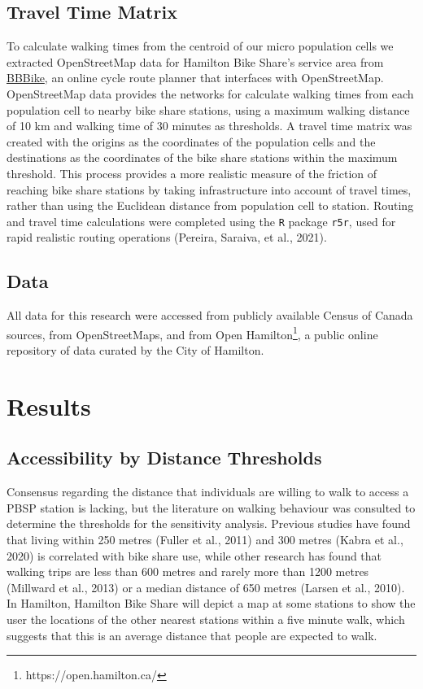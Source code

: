 \documentclass[]{elsarticle} %
\begin{document}
\hypertarget{travel-time-matrix}{%
\subsection{Travel Time Matrix}\label{travel-time-matrix}}

To calculate walking times from the centroid of our micro population
cells we extracted OpenStreetMap data for Hamilton Bike Share's service
area from \href{https://download.bbbike.org/osm/bbbike/}{BBBike}, an
online cycle route planner that interfaces with OpenStreetMap.
OpenStreetMap data provides the networks for calculate walking times
from each population cell to nearby bike share stations, using a maximum
walking distance of 10 km and walking time of 30 minutes as thresholds.
A travel time matrix was created with the origins as the coordinates of
the population cells and the destinations as the coordinates of the bike
share stations within the maximum threshold. This process provides a
more realistic measure of the friction of reaching bike share stations
by taking infrastructure into account of travel times, rather than using
the Euclidean distance from population cell to station. Routing and
travel time calculations were completed using the \texttt{R} package
\texttt{r5r}, used for rapid realistic routing operations (Pereira,
Saraiva, et al., 2021).

\hypertarget{data}{%
\subsection{Data}\label{data}}

All data for this research were accessed from publicly available Census
of Canada sources, from OpenStreetMaps, and from Open Hamilton\footnote{https://open.hamilton.ca/},
a public online repository of data curated by the City of Hamilton.

\hypertarget{results}{%
\section{Results}\label{results}}

\hypertarget{accessibility-by-distance-thresholds}{%
\subsection{Accessibility by Distance
Thresholds}\label{accessibility-by-distance-thresholds}}

Consensus regarding the distance that individuals are willing to walk to
access a PBSP station is lacking, but the literature on walking
behaviour was consulted to determine the thresholds for the sensitivity
analysis. Previous studies have found that living within 250 metres
(Fuller et al., 2011) and 300 metres (Kabra et al., 2020) is correlated
with bike share use, while other research has found that walking trips
are less than 600 metres and rarely more than 1200 metres (Millward et
al., 2013) or a median distance of 650 metres (Larsen et al., 2010). In
Hamilton, Hamilton Bike Share will depict a map at some stations to show
the user the locations of the other nearest stations within a five
minute walk, which suggests that this is an average distance that people
are expected to walk.
\end{document}
